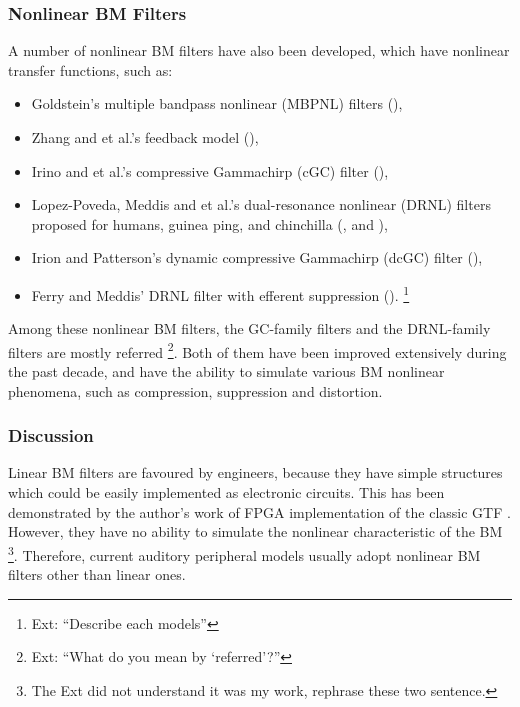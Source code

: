 \documentclass[11pt]{article}
\begin{document}
\subsubsection{Nonlinear BM Filters}
\label{sec-3-3-2}
\label{sec:ch2-nonlinear-bm-filters}

A number of nonlinear BM filters have also been developed, which have
nonlinear transfer functions, such as:

\begin{itemize}
\item Goldstein's multiple bandpass nonlinear (MBPNL) filters
  (\cite{Goldstein1990}),
\item Zhang and et al.'s feedback model (\cite{Zhang2001}),
\item Irino and et al.'s compressive Gammachirp (cGC) filter
  (\cite{Irino2001}),
\item Lopez-Poveda, Meddis and et al.'s dual-resonance nonlinear
  (DRNL) filters proposed for humans, guinea ping, and chinchilla
  (\cite{Lopez-Poveda2001}, \cite{Sumner2003b} and
  \cite{Lopez-Najera2007}),
\item Irion and Patterson's dynamic compressive Gammachirp (dcGC)
  filter (\cite{Irino2006}),
\item Ferry and Meddis' DRNL filter with efferent suppression
  (\cite{Ferry2007}). \footnote{Ext: ``Describe each models'' }
\end{itemize}


Among these nonlinear BM filters, the GC-family filters and the
DRNL-family filters are mostly referred \footnote{Ext: ``What do you mean by `referred'?'' }. Both of them have been
improved extensively during the past decade, and have the ability to
simulate various BM nonlinear phenomena, such as compression,
suppression and distortion.
\subsubsection{Discussion}
\label{sec-3-3-3}
\label{sec:ch2-discussion1}

Linear BM filters are favoured by engineers, because they have simple
structures which could be easily implemented as electronic circuits.
This has been demonstrated by the author's work of FPGA implementation
of the classic GTF \cite{Yang2009}. However, they have no ability to
simulate the nonlinear characteristic of the BM \footnote{The Ext did not understand it was my work, rephrase these two
  sentence. }. Therefore, current
auditory peripheral models usually adopt nonlinear BM filters other
than linear ones.
\end{document}
